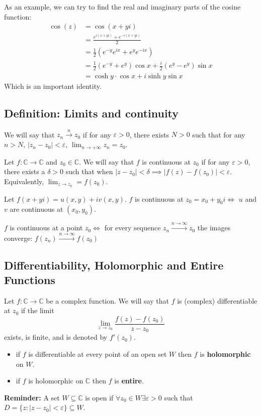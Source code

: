 As an example, we can try to find the real and imaginary parts of the cosine function:
\begin{equation*}
\begin{split}
\cos(z)&=\cos(x+yi)\\
&=\frac{e^{i(x+yi)}+e^{-i(x+yi)}}2\\
&=\frac 12 \left(e^{-y}e^{ix}+e^ye^{-ix}\right)\\
&=\frac 12(e^{-y}+e^y)\cos x + \frac i2 (e^y-e^y)\sin x\\
&=\cosh y\cdot \cos x + i \sinh y \sin x
\end{split}
\end{equation*}
Which is an important identity.

\subsection{Definition: Limits and continuity}
We will say that $z_n\stackrel{n}{\rightarrow}z_0$ 
if for any $\varepsilon > 0$, there exists $N > 0$ such that  for any $n > N$, $|z_n-z_0| < \varepsilon$, $\lim_{n\to +\infty} z_n = z_0$.

Let $f:\mathbb C \to \mathbb C$ and $z_0\in \mathbb C$. We will say that $f$ is continuous at $z_0$ if for any $\varepsilon > 0 $, there exists a $\delta > 0$ such that when $|z-z_0| < \delta\implies |f(z)-f(z_0)| < \varepsilon$.
Equivalently, $\lim_{z\to z_0} = f(z_0)$.

Let $f(x+yi) = u(x,y)+iv(x,y)$. $f$ is continuous at $z_0=x_0+y_0i\Leftrightarrow$ $u$ and $v$ are continuous at $(x_0,y_0)$.

$f$ is continuous at a point $z_0\Leftrightarrow$ for every sequence $z_n\stackrel{n\to\infty}\to z_0$ the images converge: $f(z_n)\stackrel{n\to\infty}\to f(z_0)$ 

\subsection{Differentiability, Holomorphic and Entire Functions}
Let $f:\mathbb C \to\mathbb C$ be a complex function. We will say that $f$ is (complex) differentiable at $z_0$ if the limit $$\lim_{z\to z_0} \frac{f(z)-f(z_0)}{z-z_0}$$ exists, is finite, and is denoted by $f'(z_0)$.

\begin{itemize}
    \item if $f$ is differentiable at every point of an open set $W$ then $f$ is \textbf{holomorphic} on $W$.
    \item if $f$ is holomorphic on $\mathbb C$ then $f$ is \textbf{entire}.
\end{itemize}
\textbf{Reminder:} A set $W\subseteq \mathbb C$ is open if $\forall z_0 \in W\exists \varepsilon > 0$ such that $D=\{z:|z-z_0|<\varepsilon\}\subseteq W$.

